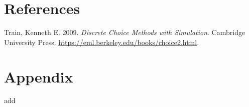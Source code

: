 \documentclass[
  letterpaper,
  DIV=11,
  numbers=noendperiod]{scrreprt}
\newlength{\cslhangindent}
\newenvironment{CSLReferences}[2] %
 {\begin{list}{}{%
  \setlength{\itemindent}{0pt}
  \setlength{\leftmargin}{0pt}
  \setlength{\parsep}{0pt}
  \ifodd #1
   \setlength{\leftmargin}{\cslhangindent}
   \setlength{\itemindent}{-1\cslhangindent}
  \fi
  \setlength{\itemsep}{#2\baselineskip}}}
 {\end{list}}
\begin{document}
\chapter*{References}\label{references}


\label{refs}
\begin{CSLReferences}{1}{0}
Train, Kenneth E. 2009. \emph{Discrete Choice Methods with Simulation}.
Cambridge University Press.
\url{https://eml.berkeley.edu/books/choice2.html}.

\end{CSLReferences}

\cleardoublepage
{}
{}
\appendix

\chapter{Appendix}\label{sec-appendix}

add
\end{document}
